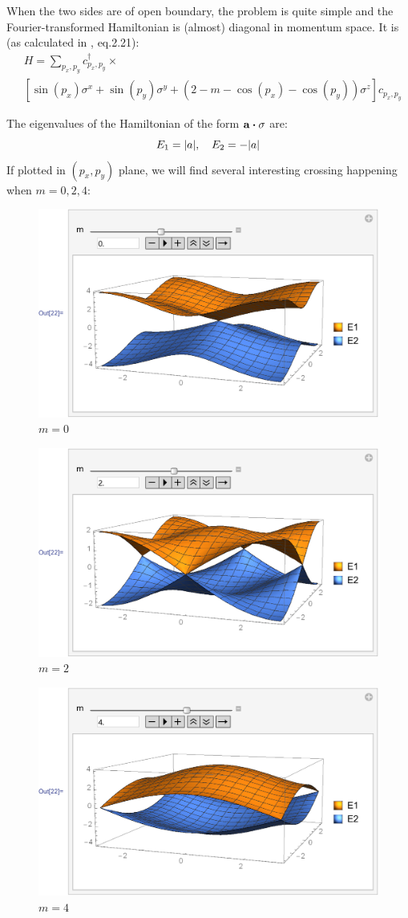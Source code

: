 \documentclass{article}
\begin{document}
When the two sides are of open boundary, the problem is quite simple
and the Fourier-transformed Hamiltonian is (almost) diagonal in
momentum space. It is (as calculated in \cite{Hughes2009}, eq.2.21):
\begin{align}
    &H =\sum_{p_x,p_y} c^\dagger_{p_x,p_y}\times
    \nonumber\\
    &
    \left[
        \sin(p_x)\sigma^x + \sin(p_y)\sigma^y
        +(2-m-\cos(p_x)-\cos(p_y))\sigma^z
    \right] c_{p_x,p_y}
\end{align}

The eigenvalues of the Hamiltonian of the form
$\vb{a}\vdot\vb{\sigma}$ are:
\begin{equation}
    E_1 = \abs{a},\quad E_2 = -\abs{a}
\end{equation}
If plotted in $(p_x,p_y)$ plane, we will find several interesting
crossing happening when $m=0,2,4$:
\begin{figure}[H]
    \centering
    \includegraphics[width=0.6\linewidth]{pics/OpenBC-inXY/E-m0.pdf}
    \caption{$m=0$}
\end{figure}
\begin{figure}[H]
    \centering
    \includegraphics[width=0.6\linewidth]{pics/OpenBC-inXY/E-m2.pdf}
    \caption{$m=2$}
\end{figure}
\begin{figure}[H]
    \centering
    \includegraphics[width=0.6\linewidth]{pics/OpenBC-inXY/E-m4.pdf}
    \caption{$m=4$}
\end{figure}
\end{document}

